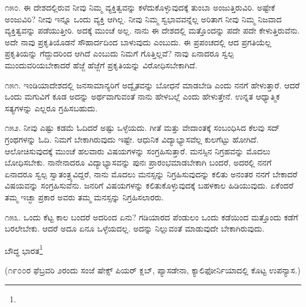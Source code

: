 ೧೫೦. ಈ ದೇಶದಲ್ಲಿರುವ ನೀವು ನಿಮ್ಮ ವ್ಯಕ್ತಿತ್ವವನ್ನು ಕಳೆದುಕೊಳ್ಳುವುದಕ್ಕೆ ತುಂಬಾ ಅಂಜುತ್ತಿರುವಿರಿ. ಅಷ್ಟೇಕೆ ಅಂಜುವಿರಿ? ನೀವು ಇನ್ನೂ ಒಂದು ವ್ಯಕ್ತಿ ಆಗಿಲ್ಲ. ನೀವು ನಿಮ್ಮ ಸ್ವಭಾವವನ್ನೆಲ್ಲ ಅರಿತಾಗ ನೀವು ನಿಮ್ಮ ನಿಜವಾದ ವ್ಯಕ್ತಿತ್ವವನ್ನು ಪಡೆಯುತ್ತೀರಿ. ಅದಕ್ಕೆ ಮುಂಚೆ ಅಲ್ಲ. ನಾನು ಈ ದೇಶದಲ್ಲಿ ಮತ್ತೊಂದನ್ನು ಪದೇ ಪದೇ ಕೇಳುತ್ತಿರುವೆನು. ಅದೇ ನಾವು ಪ್ರಕೃತಿಯೊಡನೆ ಸೌಹಾರ್ದದಿಂದ ಬಾಳುವುದು ಎಂಬುದು. ಈ ಪ್ರಪಂಚದಲ್ಲಿ ಆದ ಪ್ರಗತಿಯೆಲ್ಲ ಪ್ರಕೃತಿಯನ್ನು ಗೆದ್ದುದರಿಂದ ಆಗಿದೆ ಎಂಬುದು ನಿಮಗೆ ಗೊತ್ತಿಲ್ಲವೆ? ನಾವು ಏನಾದರೂ ಸ್ವಲ್ಪ ಮುಂದುವರಿಯಬೇಕಾದರೆ ಹೆಜ್ಜೆ ಹೆಜ್ಜೆಗೆ ಪ್ರಕೃತಿಯನ್ನು ವಿರೋಧಿಸಬೇಕಾಗಿದೆ.

೧೫೧. ಇಂಡಿಯಾದೇಶದಲ್ಲಿ ಜನಸಾಮಾನ್ಯರಿಗೆ ಅದ್ವೈತವನ್ನು ಬೋಧನೆ ಮಾಡಬೇಡಿ ಎಂದು ನನಗೆ ಹೇಳುತ್ತಾರೆ. ಆದರೆ ಒಂದು ಮಗುವಿಗೆ ಕೂಡ ಅದನ್ನು ಅರ್ಥವಾಗುವಂತೆ ನಾನು ಹೇಳಬಲ್ಲೆ ಎಂದು ಹೇಳುತ್ತೇನೆ. ಉನ್ನತ ಆಧ್ಯಾತ್ಮಿಕ ಸತ್ಯಗಳನ್ನು ಎಲ್ಲರೂ ಗ್ರಹಿಸಬಹುದು.

೧೫೨. ನೀವು ಎಷ್ಟು ಕಡಮೆ ಓದಿದರೆ ಅಷ್ಟು ಒಳ್ಳೆಯದು. ಗೀತೆ ಮತ್ತು ವೇದಾಂತಕ್ಕೆ ಸಂಬಂಧಿಸಿದ ಕೆಲವು ಸದ್ ಗ್ರಂಥಗಳನ್ನು ಓದಿ. ನಿಮಗೆ ಬೇಕಾಗಿರುವುದು ಇಷ್ಟೇ. ಆಧುನಿಕ ವಿದ್ಯಾಭ್ಯಾಸವೆಲ್ಲ ಕುಲಗೆಟ್ಟು ಹೋಗಿದೆ. ಆಲೋಚಿಸುವುದಕ್ಕೆ ಮುಂಚೆ ಹಲವಾರು ವಿಷಯಗಳನ್ನು ಸಂಗ್ರಹಿಸುತ್ತಾರೆ. ಮನಸ್ಸಿನ ನಿಗ್ರಹವನ್ನು ಮೊದಲು ಬೋಧಿಸಬೇಕು. ನಾನೇನಾದರೂ ವಿದ್ಯಾಭ್ಯಾಸವನ್ನು ಪುನಃ ಪ್ರಾರಂಭಮಾಡಬೇಕಾಗಿ ಬಂದರೆ, ಅದರಲ್ಲಿ ನನಗೆ ಏನಾದರೂ ಸ್ವಲ್ಪ ಸ್ವಾತಂತ್ರ್ಯವಿದ್ದರೆ, ನಾನು ಮೊದಲು ಮನಸ್ಸನ್ನು ನಿಗ್ರಹಿಸುವುದನ್ನು ಕಲಿತು ಅನಂತರ ನನಗೆ ಬೇಕಾದರೆ ವಿಷಯವನ್ನು ಸಂಗ್ರಹಿಸುವೆನು. ಜನರಿಗೆ ವಿಷಯಗಳನ್ನು ಕಲಿತುಕೊಳ್ಳುವುದಕ್ಕೆ ಬಹಳಕಾಲ ಹಿಡಿಯುವುದು. ಏಕೆಂದರೆ ತಮ್ಮ ಇಚ್ಛಾ ಪ್ರಕಾರ ಅವರು ತಮ್ಮ ಮನಸ್ಸನ್ನು ನಿಗ್ರಹಿಸಲಾರರು.

೧೫೩. ಒಂದು ಕೆಟ್ಟ ಕಾಲ ಬಂದರೆ ಅದರಿಂದ ಏನು? ಗಡಿಯಾರದ ಪೆಂಡುಲಂ ಒಂದು ಕಡೆಯಿಂದ ಮತ್ತೊಂದು ಕಡೆಗೆ ಬರಲೇಬೇಕು. ಆದರೆ ಅದೂ ಏನೂ ಒಳ್ಳೆಯದಲ್ಲ. ಅದನ್ನು ನಿಲ್ಲುವಂತೆ ಮಾಡುವುದೇ ಬೇಕಾಗಿರುವುದು.

ಬೌದ್ಧ ಭಾರತ\protect\footnote{}

\begin{center}
(೧೯೦೦ರ ಫೆಬ್ರವರಿ ೨ರಂದು ಸಂಜೆ ಷೇಕ್ಸ್ ಪಿಯರ್ ಕ್ಲಬ್, ಪ್ಯಾಸಡೇನಾ, ಕ್ಯಾಲಿಫೋರ್ನಿಯಾದಲ್ಲಿ ಕೊಟ್ಟ ಉಪನ್ಯಾಸ.)
\end{center}

